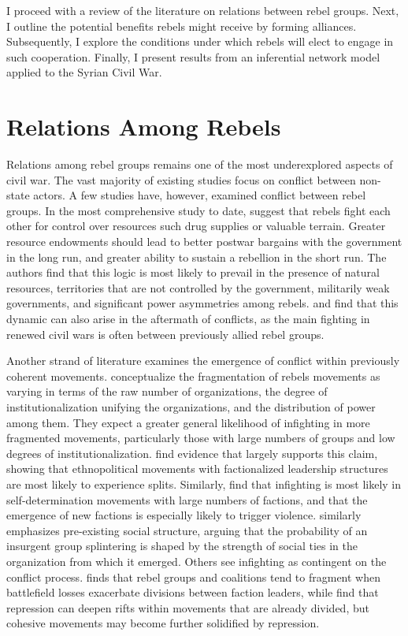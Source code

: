 \documentclass[12pt,]{book}
\begin{document}
I proceed with a review of the literature on relations between rebel
groups. Next, I outline the potential benefits rebels might receive by
forming alliances. Subsequently, I explore the conditions under which
rebels will elect to engage in such cooperation. Finally, I present
results from an inferential network model applied to the Syrian Civil
War.

\section{Relations Among Rebels}\label{relations-among-rebels}

Relations among rebel groups remains one of the most underexplored
aspects of civil war. The vast majority of existing studies focus on
conflict between non-state actors. A few studies have, however, examined
conflict between rebel groups. In the most comprehensive study to date,
\citet{Fjelde2012} suggest that rebels fight each other for control over
resources such drug supplies or valuable terrain. Greater resource
endowments should lead to better postwar bargains with the government in
the long run, and greater ability to sustain a rebellion in the short
run. The authors find that this logic is most likely to prevail in the
presence of natural resources, territories that are not controlled by
the government, militarily weak governments, and significant power
asymmetries among rebels. \citet{Atlas1999} and \citet{Zeigler2016} find
that this dynamic can also arise in the aftermath of conflicts, as the
main fighting in renewed civil wars is often between previously allied
rebel groups.

Another strand of literature examines the emergence of conflict within
previously coherent movements. \citet{Bakke2012a} conceptualize the
fragmentation of rebels movements as varying in terms of the raw number
of organizations, the degree of institutionalization unifying the
organizations, and the distribution of power among them. They expect a
greater general likelihood of infighting in more fragmented movements,
particularly those with large numbers of groups and low degrees of
institutionalization. \citet{Asal2012} find evidence that largely
supports this claim, showing that ethnopolitical movements with
factionalized leadership structures are most likely to experience
splits. Similarly, \citet{Cunningham2012a} find that infighting is most
likely in self-determination movements with large numbers of factions,
and that the emergence of new factions is especially likely to trigger
violence. \citet{Staniland2014} similarly emphasizes pre-existing social
structure, arguing that the probability of an insurgent group
splintering is shaped by the strength of social ties in the organization
from which it emerged. Others see infighting as contingent on the
conflict process. \citet{Christia2012} finds that rebel groups and
coalitions tend to fragment when battlefield losses exacerbate divisions
between faction leaders, while \citet{McLauchlin2012} find that
repression can deepen rifts within movements that are already divided,
but cohesive movements may become further solidified by repression.
\end{document}
